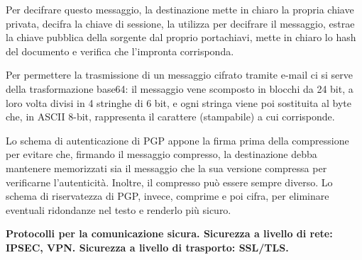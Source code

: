 \documentclass[answers, a4paper, 11pt]{exam}
\begin{document}
\begin{questions}
\begin{parts}
\begin{solution}
Per decifrare questo messaggio, la destinazione mette in chiaro la propria chiave privata, decifra la chiave di sessione, la utilizza per decifrare il messaggio, estrae la chiave pubblica della sorgente dal proprio portachiavi, mette in chiaro lo hash del documento e verifica che l'impronta corrisponda.

Per permettere la trasmissione di un messaggio cifrato tramite e-mail ci si serve della trasformazione base64: il messaggio vene scomposto in blocchi da 24 bit, a loro volta divisi in 4 stringhe di 6 bit, e ogni stringa viene poi sostituita al byte che, in ASCII 8-bit, rappresenta il carattere (stampabile) a cui corrisponde.

Lo schema di autenticazione di PGP appone la firma prima della compressione per evitare che, firmando il messaggio compresso, la destinazione debba mantenere memorizzati sia il messaggio che la sua versione compressa per verificarne l'autenticità.
Inoltre, il compresso può essere sempre diverso.
Lo schema di riservatezza di PGP, invece, comprime e poi cifra, per eliminare eventuali ridondanze nel testo e renderlo più sicuro.
\end{solution}
\end{parts}

\question \textbf{Protocolli per la comunicazione sicura. Sicurezza a livello di rete: IPSEC, VPN. Sicurezza a livello di trasporto: SSL/TLS.}
\end{questions}
\end{document}
